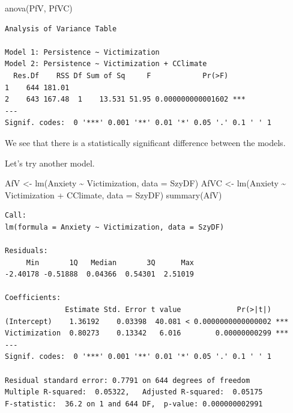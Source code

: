 \documentclass[
  english,
]{book}
\newenvironment{Shaded}{\begin{snugshade}}{\end{snugshade}}
\newcommand{\AttributeTok}[1]{\textcolor[rgb]{0.77,0.63,0.00}{#1}}
\newcommand{\FunctionTok}[1]{\textcolor[rgb]{0.00,0.00,0.00}{#1}}
\newcommand{\NormalTok}[1]{#1}
\newcommand{\OtherTok}[1]{\textcolor[rgb]{0.56,0.35,0.01}{#1}}
\newcommand{\SpecialCharTok}[1]{\textcolor[rgb]{0.00,0.00,0.00}{#1}}
\begin{document}
\begin{Shaded}
\begin{Highlighting}[]
\FunctionTok{anova}\NormalTok{(PfV, PfVC)}
\end{Highlighting}
\end{Shaded}

\begin{verbatim}
Analysis of Variance Table

Model 1: Persistence ~ Victimization
Model 2: Persistence ~ Victimization + CClimate
  Res.Df    RSS Df Sum of Sq     F            Pr(>F)    
1    644 181.01                                         
2    643 167.48  1    13.531 51.95 0.000000000001602 ***
---
Signif. codes:  0 '***' 0.001 '**' 0.01 '*' 0.05 '.' 0.1 ' ' 1
\end{verbatim}

We see that there is a statistically significant difference between the models.

Let's try another model.

\begin{Shaded}
\begin{Highlighting}[]
\NormalTok{AfV }\OtherTok{\textless{}{-}} \FunctionTok{lm}\NormalTok{(Anxiety }\SpecialCharTok{\textasciitilde{}}\NormalTok{ Victimization, }\AttributeTok{data =}\NormalTok{ SzyDF)}
\NormalTok{AfVC }\OtherTok{\textless{}{-}} \FunctionTok{lm}\NormalTok{(Anxiety }\SpecialCharTok{\textasciitilde{}}\NormalTok{ Victimization }\SpecialCharTok{+}\NormalTok{ CClimate, }\AttributeTok{data =}\NormalTok{ SzyDF)}
\FunctionTok{summary}\NormalTok{(AfV)}
\end{Highlighting}
\end{Shaded}

\begin{verbatim}
Call:
lm(formula = Anxiety ~ Victimization, data = SzyDF)

Residuals:
     Min       1Q   Median       3Q      Max 
-2.40178 -0.51888  0.04366  0.54301  2.51019 

Coefficients:
              Estimate Std. Error t value             Pr(>|t|)    
(Intercept)    1.36192    0.03398  40.081 < 0.0000000000000002 ***
Victimization  0.80273    0.13342   6.016        0.00000000299 ***
---
Signif. codes:  0 '***' 0.001 '**' 0.01 '*' 0.05 '.' 0.1 ' ' 1

Residual standard error: 0.7791 on 644 degrees of freedom
Multiple R-squared:  0.05322,   Adjusted R-squared:  0.05175 
F-statistic:  36.2 on 1 and 644 DF,  p-value: 0.000000002991
\end{verbatim}
\end{document}
